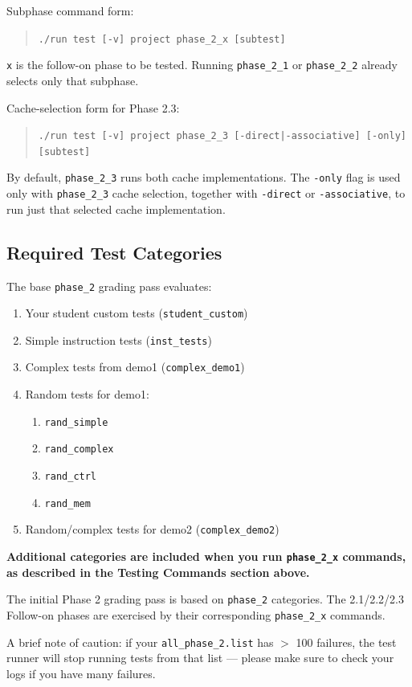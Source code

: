 \documentclass[12pt]{article}
\begin{document}
Subphase command form:
\begin{quote}
\texttt{./run test [-v] project phase\_2\_x [subtest]}
\end{quote}
\texttt{x} is the follow-on phase to be tested. Running \texttt{phase\_2\_1} or \texttt{phase\_2\_2} already selects only that subphase.

Cache-selection form for Phase 2.3:
\begin{quote}
\texttt{./run test [-v] project phase\_2\_3 [-direct|-associative] [-only] [subtest]}
\end{quote}
By default, \texttt{phase\_2\_3} runs both cache implementations. The \texttt{-only} flag is used only with \texttt{phase\_2\_3} cache selection, together with \texttt{-direct} or \texttt{-associative}, to run just that selected cache implementation.

\subsection*{Required Test Categories}
The base \texttt{phase\_2} grading pass evaluates:
\begin{enumerate}
  \item Your student custom tests (\texttt{student\_custom})
  \item Simple instruction tests (\texttt{inst\_tests})
  \item Complex tests from demo1 (\texttt{complex\_demo1})
  \item Random tests for demo1:
    \begin{enumerate}
      \item \texttt{rand\_simple}
      \item \texttt{rand\_complex}
      \item \texttt{rand\_ctrl}
      \item \texttt{rand\_mem}
    \end{enumerate}
  \item Random/complex tests for demo2 (\texttt{complex\_demo2})
\end{enumerate}

\textbf{Additional categories are included when you run \texttt{phase\_2\_x} commands, as described in the Testing Commands section above.}

The initial Phase 2 grading pass is based on \texttt{phase\_2} categories. The 2.1/2.2/2.3 Follow-on phases are exercised by their corresponding \texttt{phase\_2\_x} commands.

A brief note of caution: if your \texttt{all\_phase\_2.list} has $>$ 100 failures, the test runner will stop running tests from that list --- please make sure to check your logs if you have many failures.
\end{document}
